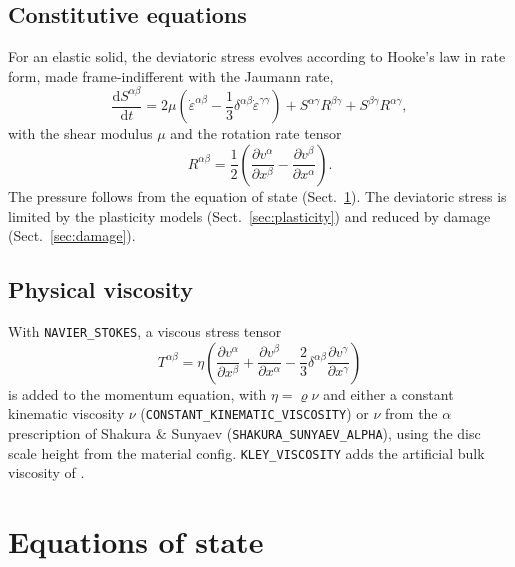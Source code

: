 \documentclass[10pt,fleqn,twoside]{article}
\newcommand{\sw}[1]{\texttt{#1}}
\newcommand{\dd}{\mathrm{d}}
\begin{document}
\subsection{Constitutive equations}
For an elastic solid, the deviatoric stress evolves according to Hooke's law in rate form, made frame-indifferent
with the Jaumann rate,
\begin{equation}
 \label{eq:dSdt}
 \frac{\dd S^{\alpha\beta}}{\dd t} = 2\mu\left(\dot\varepsilon^{\alpha\beta}
   - \frac{1}{3}\delta^{\alpha\beta}\dot\varepsilon^{\gamma\gamma}\right)
   + S^{\alpha\gamma} R^{\beta\gamma} + S^{\beta\gamma} R^{\alpha\gamma},
\end{equation}
with the shear modulus $\mu$ and the rotation rate tensor
\begin{equation}
 R^{\alpha\beta} = \frac{1}{2}\left(\frac{\partial v^\alpha}{\partial x^\beta}
  - \frac{\partial v^\beta}{\partial x^\alpha}\right).
\end{equation}
The pressure follows from the equation of state (Sect.~\ref{sec:eos}). The deviatoric stress is limited by the
plasticity models (Sect.~\ref{sec:plasticity}) and reduced by damage (Sect.~\ref{sec:damage}).

\subsection{Physical viscosity}
With \sw{NAVIER\_STOKES}, a viscous stress tensor
\begin{equation}
 T^{\alpha\beta} = \eta\left(\frac{\partial v^\alpha}{\partial x^\beta} + \frac{\partial v^\beta}{\partial x^\alpha}
 - \frac{2}{3}\delta^{\alpha\beta}\frac{\partial v^\gamma}{\partial x^\gamma}\right)
\end{equation}
is added to the momentum equation, with $\eta = \varrho\nu$ and either a constant kinematic viscosity $\nu$
(\sw{CONSTANT\_KINEMATIC\_VISCOSITY}) or $\nu$ from the $\alpha$ prescription of Shakura \& Sunyaev
(\sw{SHAKURA\_SUNYAEV\_ALPHA}), using the disc scale height from the material config. \sw{KLEY\_VISCOSITY} adds the
artificial bulk viscosity of \citet{2004A&A...418..325S}.


\section{Equations of state}
\label{sec:eos}
\end{document}
